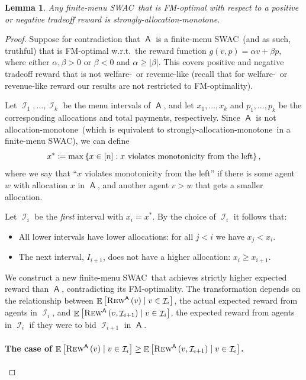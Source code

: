 \documentclass[11pt,letterpaper]{article}
\newcommand{\set}[1]{\left\{#1\right\}}
\newcommand{\sqbr}[1]{\left[ #1 \right]}
\newcommand{\samono}{strongly-allocation-monotone\xspace}
\newcommand{\amono}{allocation-monotone\xspace}
\newcommand{\swac}{SWAC\xspace}
\newcommand{\finauc}{finite-menu \swac}
\DeclareMathOperator*{\E}{\bb{E}}
\newcommand{\sqrrange}[1]{[#1]}
\newcommand{\bb}[1]{\mathbb{#1}}
\DeclareMathOperator{\A}{\auc{A}}
\DeclareMathOperator{\I}{\mathcal{I}}
\theoremstyle{plain}
\newtheorem{lemma}[theorem]{Lemma}
\newcommand{\auc}[1]{\mathsf{#1}}
\begin{document}
\begin{lemma}\label{lemma:pos-neg-tradeoff-samono}
    Any \finauc\ that is FM-optimal with respect to a positive or negative tradeoff reward
    is \samono.
\end{lemma}
\begin{proof}
Suppose for contradiction that $\A$
is a \finauc\ (and as such, truthful)
that is FM-optimal w.r.t.\ the reward function
$g(v,p) = \alpha v + \beta p$,
where  either $\alpha,\beta > 0$ or $\beta<0$ and $\alpha\geq|\beta|$.
This covers positive and negative tradeoff reward that is not welfare-\ or revenue-like (recall that for welfare-\ or revenue-like reward our results are not restricted to FM-optimality).

Let $\I_1,\ldots,\I_k$
be the menu intervals of $\A$,
and let $x_1,\ldots,x_k$
and $p_1,\dots,p_k$
be the corresponding allocations and total payments, respectively.
Since $\A$ is not \amono\ (which is equivalent to \samono\ in a \finauc), we can define 
\begin{equation*}
    x^\ast\coloneq\max\set{x\in\sqrrange{n}:x\textnormal{ violates monotonicity from the left}},
\end{equation*}
where we say that ``$x$ violates monotonicity from the left'' if there is some agent $w$ with allocation $x$ in $\A$, and another agent $v>w$ that gets a smaller allocation.

Let $\I_i$ be the \emph{first} interval with $x_i=x^\ast$. By the choice of $\I_i$ it follows that:
\begin{itemize}
    \item All lower intervals have lower allocations:
    for all $j<i$ we have $x_j<x_i$.
    \item The next interval, $I_{i+1}$, does not have a higher allocation: $x_i\geq x_{i+1}$.
\end{itemize}

We construct a new \finauc\ that achieves strictly higher expected reward than $\A$, contradicting its FM-optimality.
The transformation depends on the relationship between 
$\E\sqbr{\trew[\A]{v}\mid v\in\I_i}$,
the actual expected reward from agents in $\I_i$,
and
$\E\sqbr{\rew[\A]{v}{\I_{i+1}}\mid v\in\I_i}$, 
the expected reward from agents in $\I_i$ if they were to bid $\I_{i+1}$ in $\A$.

\paragraph{The case of $\E\sqbr{\trew[\A]{v}\mid v\in\I_i}\geq\E\sqbr{\rew[\A]{v}{\I_{i+1}}\mid v\in\I_i}$.}



\end{proof}
\end{document}
